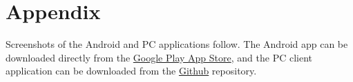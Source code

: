 \documentclass{sig-alternate}
\renewcommand\_{\textunderscore\allowbreak}  %
\begin{document}
%




\section{Appendix}
Screenshots of the Android and PC applications follow. The Android app can be downloaded directly from the \href{https://play.google.com/store/apps/details?id=edu.ucla.cs.ndnmouse}{Google Play App Store}, and the PC client application can be downloaded from the \href{https://github.com/wminner/ndnMouse/tree/master/pc_client}{Github} repository.
\end{document}
